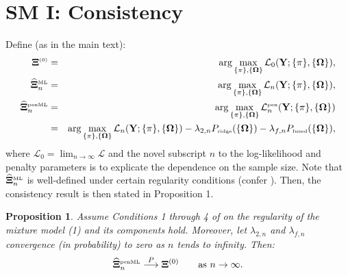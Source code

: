 \documentclass[10pt]{article}
\newtheorem{proposition}{Proposition}
\begin{document}
\section*{SM I: Consistency}
\label{SMI}
Define (as in the main text):
\begin{eqnarray*}
\mathbf{\Xi}^{\mbox{{\tiny (0)}}} & = & \arg \max_{\{\pi \}, \{\mathbf{\Omega} \}} \mathcal{L}_0(\mathbf{Y}; \{\pi \}, \{\mathbf{\Omega} \} ),
\\
\widehat{\mathbf{\Xi}}_n^{\mbox{{\tiny ML}}} & = & \arg \max_{\{\pi \}, \{\mathbf{\Omega} \}} \mathcal{L}_n(\mathbf{Y}; \{\pi \}, \{\mathbf{\Omega} \} ),
\\
\widehat{\mathbf{\Xi}}_n^{\mbox{{\tiny penML}}} & = &
\arg \max_{\{\pi \}, \{\mathbf{\Omega} \}} \mathcal{L}_n^{\mbox{{\tiny pen}} }(\mathbf{Y}; \{\pi \}, \{\mathbf{\Omega} \} )
\\
& = & \arg \max_{\{\pi \}, \{\mathbf{\Omega} \}} \mathcal{L}_n(\mathbf{Y}; \{\pi \}, \{\mathbf{\Omega} \} ) - \lambda_{2,n} P_{\mbox{{\tiny ridge}}}( \{\mathbf{\Omega} \}) - \lambda_{f,n} P_{\mbox{{\tiny fused}}}( \{\mathbf{\Omega} \}),
\end{eqnarray*}
where $\mathcal{L}_0 = \lim_{n\rightarrow \infty} \mathcal{L}$ and the novel subscript $n$ to the log-likelihood and penalty parameters is to explicate the dependence on the sample size. Note that $\widehat{\mathbf{\Xi}}_n^{\mbox{{\tiny ML}}}$ is well-defined under certain regularity conditions (confer \citealt{Redn1984}). Then, the consistency result is then stated in Proposition 1.

\begin{proposition}
Assume Conditions 1 through 4 of \cite{Redn1984} on the regularity of the mixture model (1) and its components hold. Moreover, let $\lambda_{2,n}$ and $\lambda_{f,n}$ convergence (in probability) to zero as $n$ tends to infinity. Then:
\begin{eqnarray*}
\widehat{\mathbf{\Xi}}^{\mbox{{\tiny penML}}}_n \stackrel{P}{\longrightarrow} \mathbf{\Xi}^{(0)} \qquad \mbox{as } n \rightarrow \infty.
\end{eqnarray*}
\end{proposition}
\end{document}
